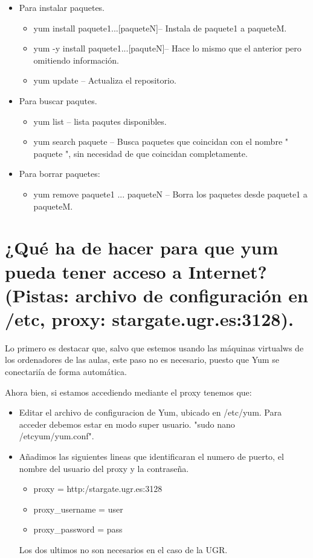 \begin{itemize}
\item Para instalar paquetes.
	\begin{itemize}
		\item  yum install paquete1...[paqueteN]-- Instala de paquete1 a paqueteM. 
		\item  yum -y install paquete1...[paquteN]-- Hace lo mismo que el anterior pero omitiendo información.
		\item  yum update -- Actualiza el repositorio. 
	\end{itemize}
\item Para buscar paqutes.
	\begin{itemize}
		\item  yum list -- lista paqutes disponibles.
		\item  yum search paquete -- Busca paquetes que coincidan con el nombre " paquete ", sin necesidad de que coincidan completamente.
	\end{itemize}
\item Para borrar paquetes:
	\begin{itemize}
		\item  yum remove paquete1 ... paqueteN -- Borra los paquetes desde paquete1 a paqueteM.
	\end{itemize}

\end{itemize}

\cite{E1}
\section{¿Qué ha de hacer para que yum pueda tener acceso a Internet?(Pistas: archivo de configuración en /etc, proxy: stargate.ugr.es:3128).}

Lo primero es destacar que, salvo que estemos usando las máquinas virtualws de los ordenadores de las aulas, este paso no es necesario, puesto que Yum se conectariía de forma automática.

Ahora bien, si estamos accediendo mediante el proxy tenemos que:


\begin{itemize}
	\item Editar el archivo de configuracion de Yum, ubicado en /etc/yum. Para acceder debemos estar en modo super usuario. "sudo nano /etcyum/yum.conf".
	\item Añadimos las siguientes lineas que identificaran el numero de puerto, el nombre del usuario del proxy y la contraseña. 
	
	\begin{itemize}
		\item proxy = http:/stargate.ugr.es:3128
	\end{itemize}
	\begin{itemize}
		\item proxy\_username = user
		\item proxy\_password = pass
	\end{itemize}
	Los dos ultimos no son necesarios en el caso de la UGR.
	
\end{itemize}

